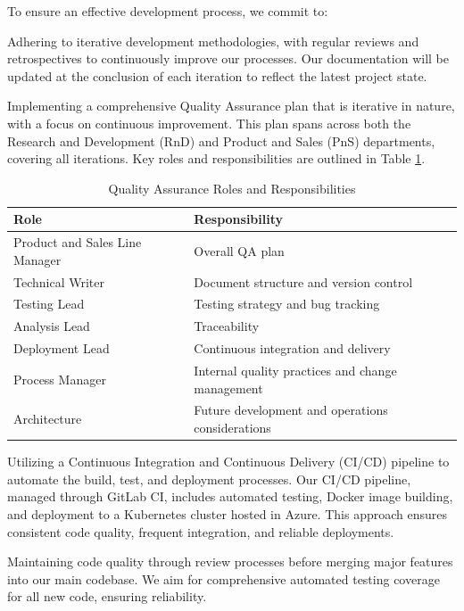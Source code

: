 To ensure an effective development process, we commit to:

Adhering to iterative development methodologies, with regular reviews and retrospectives to continuously improve our processes. Our documentation will be updated at the conclusion of each iteration to reflect the latest project state.

Implementing a comprehensive Quality Assurance plan that is iterative in nature, with a focus on continuous improvement. This plan spans across both the Research and Development (RnD) and Product and Sales (PnS) departments, covering all iterations. Key roles and responsibilities are outlined in Table \ref{tab:qa-responsibilities}.

\begin{table}[h]
\centering
\caption{Quality Assurance Roles and Responsibilities}
\label{tab:qa-responsibilities}
\begin{tabular}{|l|l|}
\hline
\textbf{Role} & \textbf{Responsibility} \\
\hline
Product and Sales Line Manager & Overall QA plan \\
Technical Writer & Document structure and version control \\
Testing Lead & Testing strategy and bug tracking \\
Analysis Lead & Traceability \\
Deployment Lead & Continuous integration and delivery \\
Process Manager & Internal quality practices and change management \\
Architecture & Future development and operations considerations \\
\hline
\end{tabular}
\end{table}

Utilizing a Continuous Integration and Continuous Delivery (CI/CD) pipeline to automate the build, test, and deployment processes. Our CI/CD pipeline, managed through GitLab CI, includes automated testing, Docker image building, and deployment to a Kubernetes cluster hosted in Azure. This approach ensures consistent code quality, frequent integration, and reliable deployments.

Maintaining code quality through review processes before merging major features into our main codebase. We aim for comprehensive automated testing coverage for all new code, ensuring reliability.

